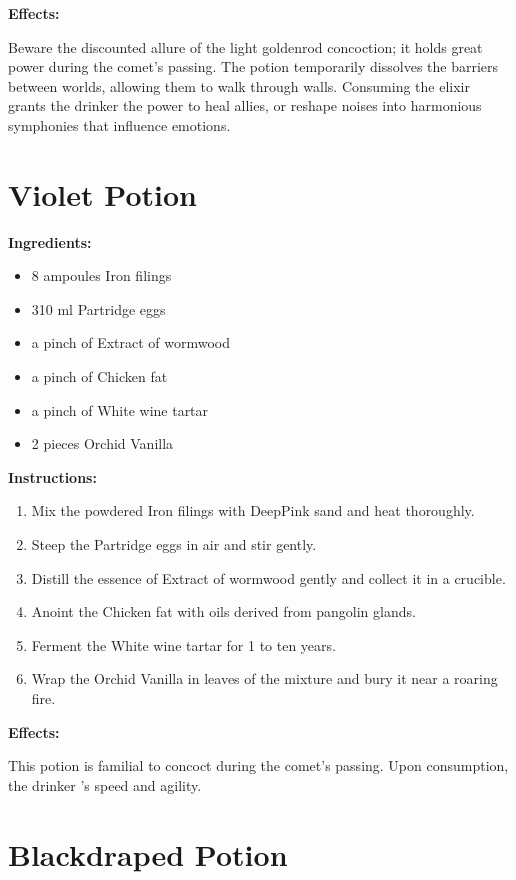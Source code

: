 \documentclass{article}
\begin{document}
\textbf{Effects:}

Beware the discounted allure of the light goldenrod concoction; it holds great power during the comet’s passing. The potion temporarily dissolves the barriers between worlds, allowing them to walk through walls. Consuming the elixir grants the drinker the power to heal allies, or reshape noises into harmonious symphonies that influence emotions.

\newpage
\section*{Violet Potion}

\textbf{Ingredients:}

\begin{itemize}
  \item 8 ampoules Iron filings
  \item 310 ml Partridge eggs
  \item a pinch of Extract of wormwood
  \item a pinch of Chicken fat
  \item a pinch of White wine tartar
  \item 2 pieces Orchid Vanilla
\end{itemize}

\textbf{Instructions:}

\begin{enumerate}
  \item Mix the powdered Iron filings with DeepPink sand and heat thoroughly.
  \item Steep the Partridge eggs in air and stir gently.
  \item Distill the essence of Extract of wormwood gently and collect it in a crucible.
  \item Anoint the Chicken fat with oils derived from pangolin glands.
  \item Ferment the White wine tartar for 1 to ten years.
  \item Wrap the Orchid Vanilla in leaves of the mixture and bury it near a roaring fire.
\end{enumerate}

\textbf{Effects:}

This potion is familial to concoct during the comet’s passing. Upon consumption, the drinker 's speed and agility.

\newpage
\section*{Blackdraped Potion}
\end{document}
